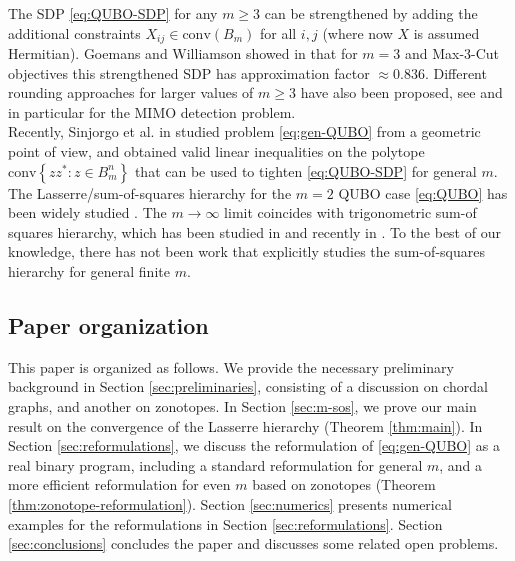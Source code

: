 \documentclass{article}
\theoremstyle{definition}
\newcommand{\conv}{\text{conv}}
\begin{document}
The SDP \eqref{eq:QUBO-SDP} for any $m\ge 3$ can be strengthened by adding the additional constraints $X_{ij}\in \conv(B_m)$ for all $i,j$ (where now $X$ is assumed Hermitian). Goemans and Williamson showed in \cite{goemans2001approximation} that for $m=3$ and Max-3-Cut objectives this strengthened SDP has approximation factor $\approx 0.836$.
Different rounding approaches for larger values of $m \geq 3$ have also been proposed, see \cite{zhang2006complex,huang2010approximation} and \cite{so2008probabilistic,jiang2021tightness,lu2019tightness} in particular for the MIMO detection problem. \\
Recently, Sinjorgo et al. in \cite{sinjorgo2024cuts} studied problem \eqref{eq:gen-QUBO} from a geometric point of view, and obtained valid linear inequalities on the polytope $\conv \left\{ zz^* : z \in B_m^n \right\}$ that can be used to tighten \eqref{eq:QUBO-SDP} for general $m$.
The Lasserre/sum-of-squares hierarchy for the $m=2$ QUBO case \eqref{eq:QUBO} has been widely studied \cite{laurent2004semidefinite,fawzi2016sparse,slot2023sum}. The $m\to \infty$ limit coincides with trigonometric sum-of squares hierarchy, which has been studied in \cite{naftalevich2006trigonometric} and recently in \cite{bach2023exponential}. 
To the best of our knowledge, there has not been work that explicitly studies the sum-of-squares hierarchy for general finite $m$.

\subsection{Paper organization}
This paper is organized as follows. We provide the necessary preliminary background in Section \ref{sec:preliminaries}, consisting of a discussion on chordal graphs, and another on zonotopes. In Section \ref{sec:m-sos}, we prove our main result on the convergence of the Lasserre hierarchy (Theorem \ref{thm:main}). In Section \ref{sec:reformulations}, we discuss the reformulation of \eqref{eq:gen-QUBO} as a real binary program, including a standard reformulation for general $m$, and a more efficient reformulation for even $m$ based on zonotopes (Theorem \ref{thm:zonotope-reformulation}). Section \ref{sec:numerics} presents numerical examples for the reformulations in Section  \ref{sec:reformulations}.
Section \ref{sec:conclusions} concludes the paper and discusses some related open problems. 
\end{document}
